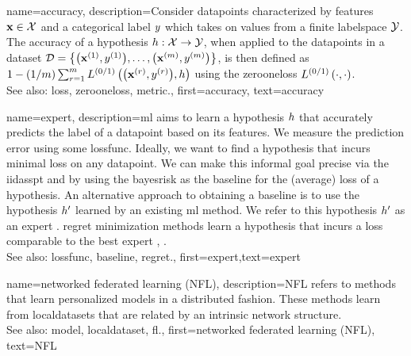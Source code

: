 {name={accuracy},
	description={Consider \glspl{datapoint} characterized by \glspl{feature} ${\bf x} \in \mathcal{X}$ and 
		a categorical \gls{label} $y$ which takes on values from a finite \gls{labelspace} $\mathcal{Y}$. The 
		accuracy of a \gls{hypothesis} $h: \mathcal{X} \rightarrow \mathcal{Y}$, when applied 
		to the \glspl{datapoint} in a \gls{dataset} $\mathcal{D} = \big\{ \big({\bf x}^{(1)}, y^{(1)} \big), \ldots, \big({\bf x}^{(m)},y^{(m)}\big) \big\}$, 
		is then defined as $1 - (1/m)\sum_{r=1}^{m} L^{(0/1)}\left(\big({\bf x}^{(r)},y^{(r)}\big),h \right)$ using the \gls{zerooneloss} $L^{(0/1)}\left(\cdot,\cdot \right)$.
					\\ 
		See also: \gls{loss}, \gls{zerooneloss}, \gls{metric}.},
	first={accuracy},
	text={accuracy} 
}





{name={expert},
	description={\gls{ml} aims to learn a \gls{hypothesis} $h$ 
	    that accurately predicts the \gls{label} of a \gls{datapoint} based on its \glspl{feature}. 
		We measure the \gls{prediction} error using some \gls{lossfunc}. Ideally, we want 
		to find a \gls{hypothesis} that incurs minimal \gls{loss} on any \gls{datapoint}. We 
		can make this informal goal precise via the \gls{iidasspt} 
		and by using the \gls{bayesrisk} as the \gls{baseline} for the (average) \gls{loss} of a \gls{hypothesis}. 
		An alternative approach to obtaining a \gls{baseline} is to use the \gls{hypothesis} $h'$ learned 
		by an existing \gls{ml} method. We refer to this \gls{hypothesis} $h'$ as an expert \cite{PredictionLearningGames}. \Gls{regret} minimization methods learn a \gls{hypothesis}
		that incurs a \gls{loss} comparable to the best expert \cite{PredictionLearningGames}, \cite{HazanOCO}.
					\\ 
		See also: \gls{lossfunc}, \gls{baseline}, \gls{regret}.},
	first={expert},text={expert} 
}

{name={networked federated learning (NFL)},
	description={NFL refers 
		to methods that learn personalized \glspl{model} in a distributed fashion. These methods learn from \glspl{localdataset} 
		that are related by an intrinsic network structure.
					\\ 
		See also: \gls{model}, \gls{localdataset}, \gls{fl}.},
	first={networked federated learning (NFL)},
	text={NFL} 
}


